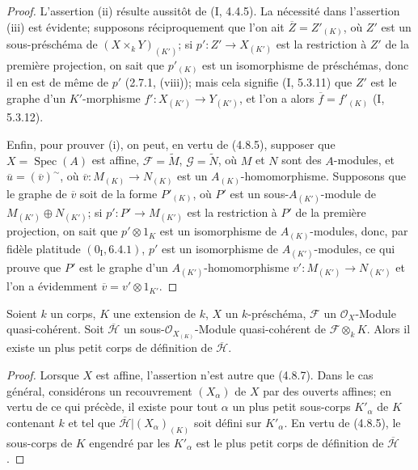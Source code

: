 \begin{proof}
L'assertion (ii) résulte aussitôt de (I, 4.4.5). La nécessité dans l'assertion
(iii) est évidente; supposons réciproquement que l'on ait
$\overline Z=Z'_{(K)}$, où $Z'$ est un sous-préschéma de
$(X\times_kY)_{(K')}$; si $p':Z'\to X_{(K')}$ est la restriction à $Z'$ de la
première projection, on sait que $p'_{(K)}$ est un isomorphisme de préschémas,
donc il en est de même de $p'$ (2.7.1, (viii)); mais cela signifie (I, 5.3.11)
que $Z'$ est le graphe d'un $K'$-morphisme
$f':X_{(K')}\to Y_{(K')}$, et l'on a alors
$\overline f=f'_{(K)}$ (I, 5.3.12).

Enfin, pour prouver (i), on peut, en vertu de (4.8.5), supposer que
$X=\operatorname{Spec}(A)$ est affine, $\mathscr F=\widetilde M$,
$\mathscr G=\widetilde N$, où $M$ et $N$ sont des $A$-modules, et
$\overline u=(\overline v)^{\sim}$, où
$\overline v:M_{(K)}\to N_{(K)}$ est un $A_{(K)}$-homomorphisme. Supposons
que le graphe de $\overline v$ soit de la forme $P'_{(K)}$, où $P'$ est un
sous-$A_{(K')}$-module de $M_{(K')}\oplus N_{(K')}$; si
$p':P'\to M_{(K')}$ est la restriction à $P'$ de la première projection, on
sait que $p'\otimes1_K$ est un isomorphisme de $A_{(K)}$-modules, donc, par
fidèle platitude $(0_{\mathrm I},6.4.1)$, $p'$ est un isomorphisme de
$A_{(K')}$-modules, ce qui prouve que $P'$ est le graphe d'un
$A_{(K')}$-homomorphisme $v':M_{(K')}\to N_{(K')}$ et l'on a évidemment
$\overline v=v'\otimes1_{K'}$.
\end{proof}

\begin{proposition}[4.8.9]
\label{IV.2.4.8.9-fr}
Soient $k$ un corps, $K$ une extension de $k$, $X$ un $k$-préschéma,
$\mathscr F$ un $\mathcal O_X$-Module quasi-cohérent. Soit $\overline{\mathscr H}$ un
sous-$\mathcal O_{X_{(K)}}$-Module quasi-cohérent de
$\mathscr F\otimes_kK$. Alors il existe un plus petit corps de définition de
$\overline{\mathscr H}$.
\end{proposition}

\begin{proof}
Lorsque $X$ est affine, l'assertion n'est autre que (4.8.7). Dans le cas
général, considérons un recouvrement $(X_\alpha)$ de $X$ par des ouverts
affines; en vertu de ce qui précède, il existe pour tout $\alpha$ un plus petit
sous-corps $K'_\alpha$ de $K$ contenant $k$ et tel que
$\overline{\mathscr H}|(X_\alpha)_{(K)}$ soit défini sur $K'_\alpha$. En vertu de
(4.8.5), le sous-corps de $K$ engendré par les $K'_\alpha$ est le plus petit
corps de définition de $\overline{\mathscr H}$.
\end{proof}

